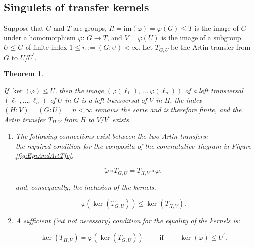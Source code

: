 \documentclass{amsart}
\newtheorem{theorem}{Theorem}[section]
\theoremstyle{definition}
\numberwithin{equation}{section}
\begin{document}
\subsection{Singulets of transfer kernels}
\label{ss:KernelSing}

Suppose that \(G\) and \(T\) are groups, \(H=\mathrm{im}(\varphi)=\varphi(G)\le T\) is the image of \(G\)
under a homomorphism \(\varphi:\ G\to T\),
and \(V=\varphi(U)\) is the image of a subgroup \(U\le G\) of finite index \(1\le n:=(G:U)<\infty\).
Let \(T_{G,U}\) be the Artin transfer from \(G\) to \(U/U^\prime\).

\begin{theorem}
\label{thm:KernelSing}

If \(\ker(\varphi)\le U\),
then the image \((\varphi(\ell_1),\ldots,\varphi(\ell_n))\)
of a left transversal \((\ell_1,\ldots,\ell_n)\) of \(U\) in \(G\)
is a left transversal  of \(V\) in \(H\),
the index \((H:V)=(G:U)=n<\infty\) remains the same and is therefore finite,
and the Artin transfer \(T_{H,V}\) from \(H\) to \(V/V^\prime\) exists.

\begin{enumerate}

\item
The following connections exist between the two Artin transfers:\\
the required condition for the composita
of the commutative diagram in Figure
\ref{fig:EpiAndArtTfe},

\begin{equation}
\label{eqn:FunctorialMorphism}
\tilde{\varphi}\circ T_{G,U}=T_{H,V}\circ\varphi,
\end{equation}

\noindent
and, consequently, the inclusion of the kernels,

\begin{equation}
\label{eqn:KernelInclusion}
\varphi(\ker(T_{G,U}))\le\ker(T_{H,V}).
\end{equation}

\item
A sufficient (but not necessary) condition for the equality of the kernels is:

\begin{equation}
\label{eqn:KernelCoincidence}
\ker(T_{H,V})=\varphi(\ker(T_{G,U}))
\qquad \text{ if } \qquad
\ker(\varphi)\le U^\prime.
\end{equation}

\end{enumerate}

\end{theorem}
\end{document}
